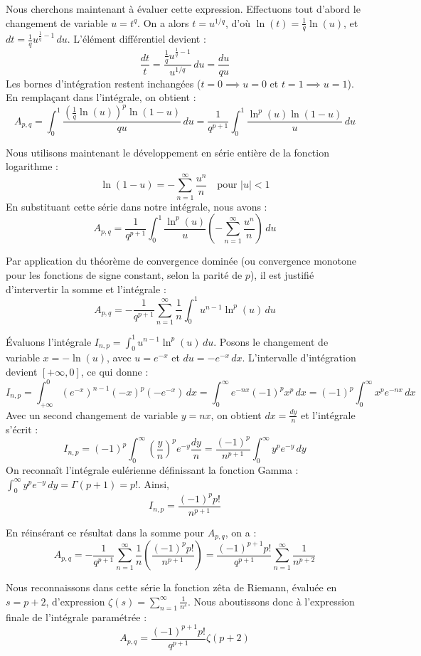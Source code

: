 \documentclass{article}
\begin{document}
Nous cherchons maintenant à évaluer cette expression. Effectuons tout d'abord le changement de variable $u = t^q$. On a alors $t = u^{1/q}$, d'où $\ln(t) = \frac{1}{q} \ln(u)$, et $dt = \frac{1}{q} u^{\frac{1}{q}-1} \, du$.
L'élément différentiel devient :
\[
\frac{dt}{t} = \frac{\frac{1}{q} u^{\frac{1}{q}-1}}{u^{1/q}} \, du = \frac{du}{q u}
\]
Les bornes d'intégration restent inchangées ($t=0 \implies u=0$ et $t=1 \implies u=1$). 
En remplaçant dans l'intégrale, on obtient :
\[
A_{p,q} = \int_0^1 \frac{\left( \frac{1}{q} \ln(u) \right)^p \ln(1-u)}{q u} \, du = \frac{1}{q^{p+1}} \int_0^1 \frac{\ln^p(u) \ln(1-u)}{u} \, du
\]

Nous utilisons maintenant le développement en série entière de la fonction logarithme :
\[
\ln(1-u) = - \sum_{n=1}^\infty \frac{u^n}{n} \quad \text{pour } |u| < 1
\]
En substituant cette série dans notre intégrale, nous avons :
\[
A_{p,q} = \frac{1}{q^{p+1}} \int_0^1 \frac{\ln^p(u)}{u} \left( - \sum_{n=1}^\infty \frac{u^n}{n} \right) \, du
\]

Par application du théorème de convergence dominée (ou convergence monotone pour les fonctions de signe constant, selon la parité de $p$), il est justifié d'intervertir la somme et l'intégrale :
\[
A_{p,q} = - \frac{1}{q^{p+1}} \sum_{n=1}^\infty \frac{1}{n} \int_0^1 u^{n-1} \ln^p(u) \, du
\]

Évaluons l'intégrale $I_{n,p} = \int_0^1 u^{n-1} \ln^p(u) \, du$.
Posons le changement de variable $x = -\ln(u)$, avec $u = e^{-x}$ et $du = -e^{-x} \, dx$.
L'intervalle d'intégration devient $[+\infty, 0]$, ce qui donne :
\[
I_{n,p} = \int_{+\infty}^0 (e^{-x})^{n-1} (-x)^p (-e^{-x}) \, dx = \int_0^\infty e^{-nx} (-1)^p x^p \, dx = (-1)^p \int_0^\infty x^p e^{-nx} \, dx
\]
Avec un second changement de variable $y = nx$, on obtient $dx = \frac{dy}{n}$ et l'intégrale s'écrit :
\[
I_{n,p} = (-1)^p \int_0^\infty \left(\frac{y}{n}\right)^p e^{-y} \frac{dy}{n} = \frac{(-1)^p}{n^{p+1}} \int_0^\infty y^p e^{-y} \, dy
\]
On reconnaît l'intégrale eulérienne définissant la fonction Gamma : $\int_0^\infty y^p e^{-y} \, dy = \Gamma(p+1) = p!$.
Ainsi,
\[
I_{n,p} = \frac{(-1)^p p!}{n^{p+1}}
\]

En réinsérant ce résultat dans la somme pour $A_{p,q}$, on a :
\[
A_{p,q} = - \frac{1}{q^{p+1}} \sum_{n=1}^\infty \frac{1}{n} \left( \frac{(-1)^p p!}{n^{p+1}} \right) = \frac{(-1)^{p+1} p!}{q^{p+1}} \sum_{n=1}^\infty \frac{1}{n^{p+2}}
\]

Nous reconnaissons dans cette série la fonction zêta de Riemann, évaluée en $s = p+2$, d'expression $\zeta(s) = \sum_{n=1}^\infty \frac{1}{n^s}$.
Nous aboutissons donc à l'expression finale de l'intégrale paramétrée :
\[
A_{p,q} = \frac{(-1)^{p+1} p!}{q^{p+1}} \zeta(p+2)
\]
\end{document}
